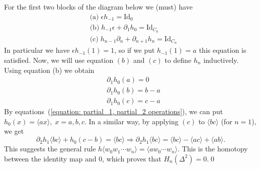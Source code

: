 For the first two blocks of the diagram below we (must) have 
\begin{equation}
    \begin{split}
        &\text{(a)}\;\epsilon h_{-1} = \text{Id}_0\\
        &\text{(b)}\;h_{-1}\epsilon + \partial_1 h_0 = \text{Id}_{C_0}\\
        &\text{(c)}\; h_{n-1}\partial_n +\partial_{n+1} h_n = \text{Id}_{C_n}
    \end{split}
\end{equation}
In particular we have $\epsilon h_{-1}(1)=1$, so if we put $h_{-1}(1)=a$ this equation is satisfied. Now, we will use equation 
$(b)$ and $(c)$ to define $h_n$ inductively. Using equation (b) we obtain 
\begin{equation}
    \begin{split}
        &\partial_1h_0(a)=0\\
        &\partial_1h_0(b)=b-a\\
        &\partial_1h_0(c)=c-a 
    \end{split}
\end{equation}
By equations~(\ref{equation: partial_1, partial_2 operations}), we can put  
$h_0(x)=\langle a x\rangle,\;x=a,b,c$. In a similar way, by applying $(c)$ to $\langle bc\rangle$ (for $n=1$), we get  
\begin{equation}
    \partial_2h_1\langle bc\rangle + h_0(c-b)=\langle bc\rangle\Rightarrow \partial_2 h_1\langle bc\rangle = 
    \langle bc\rangle-\langle ac\rangle+\langle ab\rangle.
\end{equation}
This suggests the general rule $h\langle w_0w_1\cdots w_n\rangle = \langle aw_0\cdots w_n\rangle$. This is the 
homotopy between the identity map and 0, which proves that $H_n(\Delta^2)=0$.\qed


